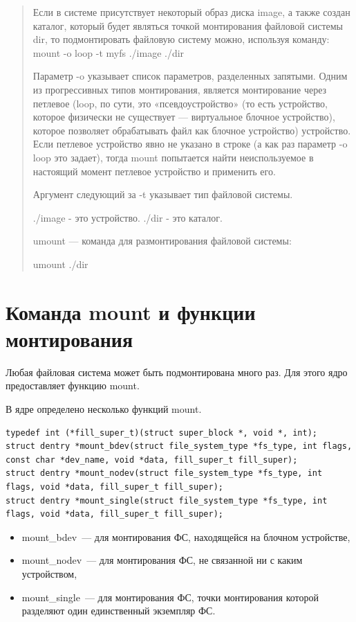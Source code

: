 \begin{quote}
Если в системе присутствует некоторый образ диска image, а также создан каталог, который будет являться точкой монтирования файловой системы dir, то подмонтировать файловую систему можно, используя команду: mount -o loop -t myfs ./image ./dir

Параметр -o указывает список параметров, разделенных запятыми. Одним из прогрессивных типов монтирования, является монтирование через петлевое (loop, по сути, это «псевдоустройство» (то есть устройство, которое физически не существует --- виртуальное блочное устройство), которое позволяет обрабатывать файл как блочное устройство) устройство. Если петлевое устройство явно не указано в строке (а как раз параметр -o loop это задает), тогда mount попытается найти неиспользуемое в настоящий момент петлевое устройство и применить его.

Аргумент следующий за -t указывает тип файловой системы.

./image - это устройство. ./dir - это каталог.

umount — команда для размонтирования файловой системы:

umount ./dir
\end{quote}

\section{Команда mount и функции монтирования}

Любая файловая система может быть подмонтирована много раз. Для этого ядро предоставляет функцию mount.

В ядре определено несколько функций mount.
\begin{lstlisting}
typedef int (*fill_super_t)(struct super_block *, void *, int);
struct dentry *mount_bdev(struct file_system_type *fs_type, int flags, const char *dev_name, void *data, fill_super_t fill_super);
struct dentry *mount_nodev(struct file_system_type *fs_type, int flags, void *data, fill_super_t fill_super);
struct dentry *mount_single(struct file_system_type *fs_type, int flags, void *data, fill_super_t fill_super);
\end{lstlisting}

\begin{itemize}
    \item mount\_bdev — для монтирования ФС, находящейся на блочном устройстве,
    \item mount\_nodev — для монтирования ФС, не связанной ни с каким устройством,
    \item mount\_single — для монтирования ФС, точки монтирования которой разделяют один единственный экземпляр ФС.
\end{itemize}

